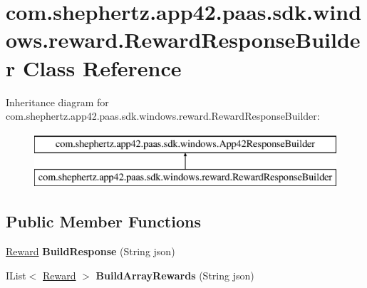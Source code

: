 \hypertarget{classcom_1_1shephertz_1_1app42_1_1paas_1_1sdk_1_1windows_1_1reward_1_1_reward_response_builder}{\section{com.\+shephertz.\+app42.\+paas.\+sdk.\+windows.\+reward.\+Reward\+Response\+Builder Class Reference}
\label{classcom_1_1shephertz_1_1app42_1_1paas_1_1sdk_1_1windows_1_1reward_1_1_reward_response_builder}
}
Inheritance diagram for com.\+shephertz.\+app42.\+paas.\+sdk.\+windows.\+reward.\+Reward\+Response\+Builder\+:\begin{figure}[H]
\begin{center}
\leavevmode
\includegraphics[height=2.000000cm]{classcom_1_1shephertz_1_1app42_1_1paas_1_1sdk_1_1windows_1_1reward_1_1_reward_response_builder}
\end{center}
\end{figure}
\subsection*{Public Member Functions}
\begin{DoxyCompactItemize}
\item 
\hypertarget{classcom_1_1shephertz_1_1app42_1_1paas_1_1sdk_1_1windows_1_1reward_1_1_reward_response_builder_a1aa45e5fa103151becb5e73b70b057db}{\hyperlink{classcom_1_1shephertz_1_1app42_1_1paas_1_1sdk_1_1windows_1_1reward_1_1_reward}{Reward} {\bfseries Build\+Response} (String json)}\label{classcom_1_1shephertz_1_1app42_1_1paas_1_1sdk_1_1windows_1_1reward_1_1_reward_response_builder_a1aa45e5fa103151becb5e73b70b057db}

\item 
\hypertarget{classcom_1_1shephertz_1_1app42_1_1paas_1_1sdk_1_1windows_1_1reward_1_1_reward_response_builder_a144eb6d9062adf0468af1542f7d911d1}{I\+List$<$ \hyperlink{classcom_1_1shephertz_1_1app42_1_1paas_1_1sdk_1_1windows_1_1reward_1_1_reward}{Reward} $>$ {\bfseries Build\+Array\+Rewards} (String json)}\label{classcom_1_1shephertz_1_1app42_1_1paas_1_1sdk_1_1windows_1_1reward_1_1_reward_response_builder_a144eb6d9062adf0468af1542f7d911d1}

\end{DoxyCompactItemize}
